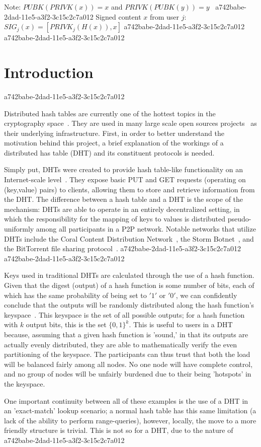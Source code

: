 \documentclass[12pt]{article}
\begin{document}
Note: $PUBK(PRIVK(x)) = x$ and $PRIVK(PUBK(y)) = y$~
a742babe-2dad-11e5-a3f2-3c15c2c7a012
Signed content $x$ from user $j$: $SIG_j(x) = \left[ PRIVK_j( H(x) ), x \right]$
a742babe-2dad-11e5-a3f2-3c15c2c7a012
a742babe-2dad-11e5-a3f2-3c15c2c7a012\section{Introduction}
a742babe-2dad-11e5-a3f2-3c15c2c7a012\par Distributed hash tables are currently one of the hottest topics in the cryptography space~\cite{Stoica:2001dj,Rowstron:2001ea,Ratnasamy:2001wn}. They are used in many large scale open sources projects~\cite{Freitas:2013tb,Xu:2010vs,Perfitt:2010fh} as their underlying infrastructure. First, in order to better understand the motivation behind this project, a brief explanation of the workings of a distributed has table (DHT) and its constituent protocols is needed.

\par Simply put, DHTs were created to provide hash table-like functionality on an Internet-scale level~\cite{Ratnasamy:2001wn}. They expose basic PUT and GET requests (operating on (key,value) pairs) to clients, allowing them to store and retrieve information from the DHT. The difference between a hash table and a DHT is the scope of the mechanism: DHTs are able to operate in an entirely decentralized setting, in which the responsibility for the mapping of keys to values is distributed pseudo-uniformly among all participants in a P2P network. Notable networks that utilize DHTs include the Coral Content Distribution Network~\cite{Freedman:2004vb}, the Storm Botnet~\cite{Holz:2008uk}, and the BitTorrent file sharing protocol~\cite{Cohen:y1_8mBnw}.
a742babe-2dad-11e5-a3f2-3c15c2c7a012
a742babe-2dad-11e5-a3f2-3c15c2c7a012\par Keys used in traditional DHTs are calculated through the use of a hash function. Given that the digest (output) of a hash function is some number of bits, each of which has the same probability of being set to $'1'$ or $'0'$, we can confidently conclude that the outputs will be randomly distributed along the hash function's keyspace~. This keyspace is the set of all possible outputs; for a hash function with $k$ output bits, this is the set $\{0,1\}^k$. This is useful to users in a DHT because, assuming that a given hash function is 'sound,' in that its outputs are actually evenly distributed, they are able to mathematically verify the even partitioning of the keyspace. The participants can thus trust that both the load will be balanced fairly among all nodes. No one node will have complete control, and no group of nodes will be unfairly burdened due to their being 'hotspots' in the keyspace.~

\par One important continuity between all of these examples is the use of a DHT in an 'exact-match' lookup scenario; a normal hash table has this same limitation (a lack of the ability to perform range-queries), however, locally, the move to a more friendly structure is trivial. This is not so for a DHT, due to the nature of
a742babe-2dad-11e5-a3f2-3c15c2c7a012\printbibliography
\end{document}
